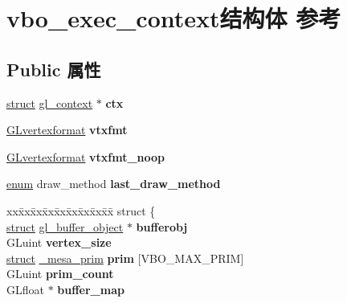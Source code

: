 \hypertarget{structvbo__exec__context}{}\section{vbo\+\_\+exec\+\_\+context结构体 参考}
\label{structvbo__exec__context}
\subsection*{Public 属性}
\begin{DoxyCompactItemize}
\item 
\mbox{\label{structvbo__exec__context_ac3d83dbb8609c7eb38db5cd3e410c231}} 
\hyperlink{interfacestruct}{struct} \hyperlink{structgl__context}{gl\+\_\+context} $\ast$ {\bfseries ctx}
\item 
\mbox{\label{structvbo__exec__context_a13f9a473b3c4135eace928c6c448de8f}} 
\hyperlink{struct_g_lvertexformat}{G\+Lvertexformat} {\bfseries vtxfmt}
\item 
\mbox{\label{structvbo__exec__context_aaf234abaa4cfb6659c2975120088fbe8}} 
\hyperlink{struct_g_lvertexformat}{G\+Lvertexformat} {\bfseries vtxfmt\+\_\+noop}
\item 
\mbox{\label{structvbo__exec__context_aa97eabfc0a38e10bcc9cdabca35dffee}} 
\hyperlink{interfaceenum}{enum} draw\+\_\+method {\bfseries last\+\_\+draw\+\_\+method}
\item 
\mbox{\label{structvbo__exec__context_af66e1c64c9024956d1cb7f03d7924d8e}} 
\begin{tabbing}
xx\=xx\=xx\=xx\=xx\=xx\=xx\=xx\=xx\=\kill
struct \{\\
\>\hyperlink{interfacestruct}{struct} \hyperlink{structgl__buffer__object}{gl\_buffer\_object} $\ast$ {\bfseries bufferobj}\\
\>GLuint {\bfseries vertex\_size}\\
\>\hyperlink{interfacestruct}{struct} \hyperlink{struct__mesa__prim}{\_mesa\_prim} {\bfseries prim} \mbox{[}VBO\_MAX\_PRIM\mbox{]}\\
\>GLuint {\bfseries prim\_count}\\
\>GLfloat $\ast$ {\bfseries buffer\_map}\\

\end{tabbing}
\end{DoxyCompactItemize}

